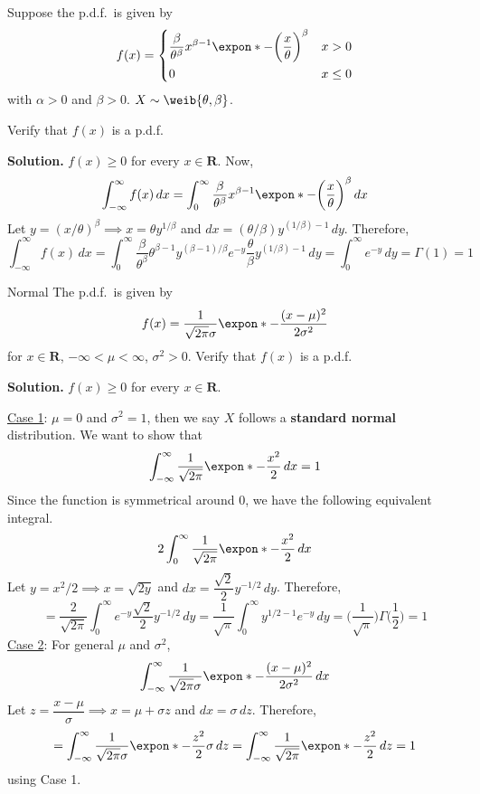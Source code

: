 \begin{Example}{}{}
    Suppose the p.d.f.\ is given by
    \[ f(x)=\begin{dcases}
            \frac{\beta}{\theta^\beta}x^{\beta-1}
            \expon*{-\biggl(\frac{x}{\theta}\biggr)^\beta} & x>0    \\
            0                                              & x\le 0
        \end{dcases} \]
    with $ \alpha>0 $ and $ \beta>0 $.
    $ X \sim \weib{\theta,\beta} $.

    Verify that $ f(x) $ is a p.d.f.

    \textbf{Solution.} $ f(x)\ge 0 $ for every $ x\in\mathbf{R} $. Now,
    \[ \int_{-\infty}^{\infty} f(x)\, d{x} =
        \int_{0}^{\infty} \frac{\beta}{\theta^\beta}x^{\beta-1}
        \expon*{-\biggl(\frac{x}{\theta}\biggr)^\beta} \, d{x} \]
    Let $ y=(x/\theta)^\beta \implies
        x=\theta y^{1/\beta} $ and $ dx=(\theta/\beta) y^{(1/\beta)-1}\,dy $.
    Therefore,
    \[ \int_{-\infty}^{\infty} f(x)\, d{x}=\int_{0}^{\infty} \frac{\beta}{\theta^\beta} \theta^{\beta-1}
        y^{(\beta-1)/\beta}e^{-y}\frac{\theta}{\beta} y^{(1/\beta)-1}\, d{y}
        =\int_{0}^{\infty} e^{-y}\, d{y}=\Gamma(1)=1  \]
\end{Example}

\begin{Example}{Normal}{}
    The p.d.f.\ is given by
    \[ f(x)=\frac{1}{\sqrt{2\pi}\sigma}\expon*{-\frac{(x-\mu)^2}{2\sigma^2}}  \]
    for $ x\in\mathbf{R} $, $ -\infty<\mu<\infty $, $ \sigma^2>0 $.
    Verify that $ f(x) $ is a p.d.f.

    \textbf{Solution.} $ f(x)\ge 0 $ for every $ x\in\mathbf{R} $.

    \underline{Case 1}: $ \mu=0 $ and $ \sigma^2=1 $, then
    we say $ X $ follows a \textbf{standard normal} distribution.
    We want to show that
    \[ \int_{-\infty}^{\infty} \frac{1}{\sqrt{2\pi}}\expon*{-\frac{x^2}{2}} \, d{x}=1  \]
    Since the function is symmetrical around 0, we have the following equivalent integral.
    \[ 2\int_{0}^{\infty} \frac{1}{\sqrt{2\pi}}\expon*{-\frac{x^2}{2}} \, d{x}  \]
    Let $ y=x^2/2\implies x=\sqrt{2y} $
    and $ dx=\dfrac{\sqrt{2}}{2} y^{-1/2}\,dy $. Therefore,
    \[ =\frac{2}{\sqrt{2\pi}}\int_{0}^{\infty} e^{-y}\frac{\sqrt{2}}{2} y^{-1/2}\, d{y}
        =\frac{1}{\sqrt{\pi}}\int_{0}^{\infty} y^{1/2-1}e^{-y}\, d{y}=
        \biggl(\frac{1}{\sqrt{\pi}}\biggr)\Gamma\biggl(\frac{1}{2}\biggr)=1    \]
    \underline{Case 2}: For general $ \mu $ and $ \sigma^2 $,
    \[ \int_{-\infty}^{\infty}  \frac{1}{\sqrt{2\pi}\sigma}\expon*{-\frac{(x-\mu)^2}{2\sigma^2}} \, d{x} \]
    Let $ z=\dfrac{x-\mu}{\sigma}\implies x=\mu+\sigma z  $
    and $ dx=\sigma\,dz $. Therefore,
    \[ =\int_{-\infty}^{\infty} \frac{1}{\sqrt{2\pi}\sigma}
        \expon*{-\frac{z^2}{2}}\sigma \, d{z}=
        \int_{-\infty}^{\infty} \frac{1}{\sqrt{2\pi}}\expon*{-\frac{z^2}{2}} \, d{z}=1   \]
    using Case 1.
\end{Example}
